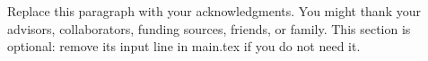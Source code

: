 Replace this paragraph with your acknowledgments. You might thank your advisors,
collaborators, funding sources, friends, or family. This section is optional:
remove its input line in main.tex if you do not need it.
